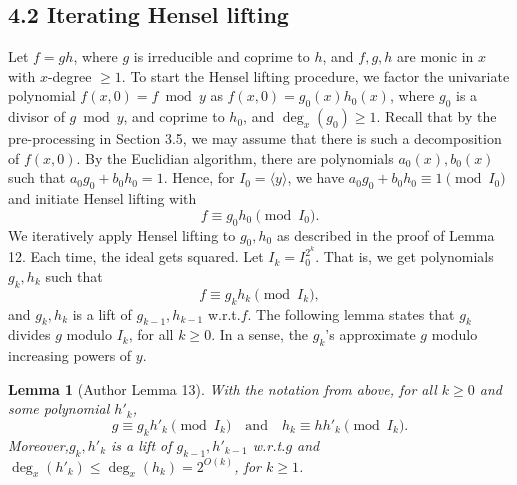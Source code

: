 \documentclass[10pt,a4paper]{article}
\newtheorem{ntlemma}[nttheorem]{Lemma}
\begin{document}
\subsection*{4.2 Iterating Hensel lifting}
Let $f=gh$, where $g$ is irreducible and coprime to $h$, and $f,g,h$ are monic in $x$ with $x$-degree $\geq1$.
To start the Hensel lifting procedure, we factor the univariate polynomial $f(x,0)=f\bmod y$ as $f(x,0)=g_0(x)h_0(x)$, where $g_0$ is a divisor of $g\bmod y$, and coprime to $h_0$, and $\deg_x(g_0)\geq1$. Recall that by the pre-processing in Section 3.5, we may assume that there is such a decomposition of $f(x,0)$.
By the Euclidian algorithm, there are polynomials $a_0(x),b_0(x)$ such that $a_0g_0+b_0h_0=1$. Hence, for $I_0=\langle y\rangle$, we have $a_0g_0+b_0h_0\equiv1\pmod{I_0}$ and initiate Hensel lifting with
\[f\equiv g_0h_0\pmod{I_0}.\]
We iteratively apply Hensel lifting to $g_0,h_0$ as described in the proof of Lemma 12. Each time, the ideal gets squared. Let $I_k=I_0^{2^k}$. That is, we get polynomials $g_k,h_k$ such that
\[f\equiv g_kh_k\pmod{I_k},\]
and $g_k,h_k$ is a lift of $g_{k-1},h_{k-1}$ w.r.t.$f$. The following lemma states that $g_k$ divides $g$ modulo $I_k$, for all $k\geq0$. In a sense, the $g_k$'s approximate $g$ modulo increasing powers of $y$.
\begin{ntlemma}[Author Lemma 13]
With the notation from above, for all $k\geq0$ and some polynomial $h'_k$,
\[g\equiv g_kh'_k\pmod{I_k}\quad\text{and}\quad h_k\equiv hh'_k\pmod{I_k}.\]
Moreover,$g_k,h'_k$ is a lift of $g_{k-1},h'_{k-1}$ w.r.t.$g$ and $\deg_x(h'_k)\leq\deg_x(h_k)=2^{O(k)}$, for $k\geq1$.
\end{ntlemma}
\end{document}
